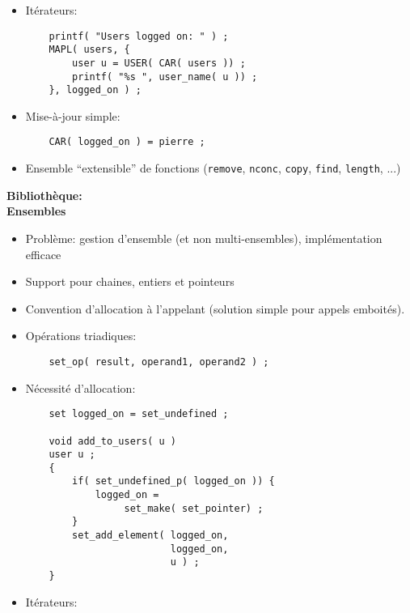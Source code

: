 \documentclass[11pt]{article}
\begin{document}
{\begin{itemize}
\begin{verbatim}
    list logged_on = NIL ;

    void add_to_users( u )
    user u ;
    {
        logged_on =
            CONS( USER, u, logged_on ) ;
    }
\end{verbatim}
\item Itérateurs:

\begin{verbatim}
    printf( "Users logged on: " ) ;
    MAPL( users, {
        user u = USER( CAR( users )) ;
        printf( "%s ", user_name( u )) ;
    }, logged_on ) ;
\end{verbatim}  
\item Mise-à-jour simple:

\begin{verbatim}
    CAR( logged_on ) = pierre ;
\end{verbatim}
\item Ensemble ``extensible{}'' de fonctions ({\tt remove}, {\tt nconc},
{\tt copy}, {\tt find}, {\tt length}, ...)
\end{itemize}

\newpage

\begin{center}
{\huge\bf Bibliothèque: \\
Ensembles}
\end{center}

\vskip 2cm

\begin{itemize}
\item Problème: gestion d'ensemble (et non multi-ensembles),
implémentation efficace
\item Support pour chaines, entiers et pointeurs
\item Convention d'allocation à l'appelant (solution simple pour appels
emboités).
\item Opérations triadiques:

\begin{verbatim}
    set_op( result, operand1, operand2 ) ;
\end{verbatim}
\item Nécessité d'allocation:

\begin{verbatim}
    set logged_on = set_undefined ;

    void add_to_users( u )
    user u ;
    {
        if( set_undefined_p( logged_on )) {
            logged_on = 
                 set_make( set_pointer) ;
        }
        set_add_element( logged_on, 
                         logged_on, 
                         u ) ;
    }
\end{verbatim}
\item Itérateurs:


\end{itemize}}
\end{document}
